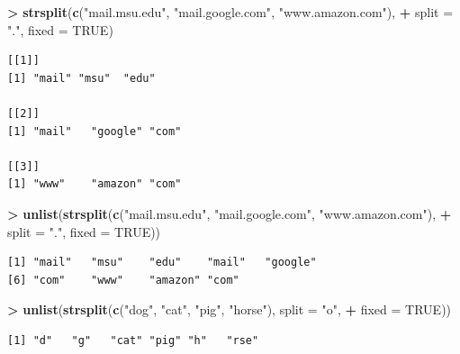 \documentclass[]{krantz}
\makeatletter
\newenvironment{Shaded}{\begin{snugshade}}{\end{snugshade}}
\newcommand{\DataTypeTok}[1]{\textcolor[rgb]{0.27,0.27,0.27}{#1}}
\newcommand{\KeywordTok}[1]{\textcolor[rgb]{0.27,0.27,0.27}{\textbf{#1}}}
\newcommand{\NormalTok}[1]{#1}
\newcommand{\OperatorTok}[1]{\textcolor[rgb]{0.43,0.43,0.43}{\textbf{#1}}}
\newcommand{\OtherTok}[1]{\textcolor[rgb]{0.37,0.37,0.37}{#1}}
\newcommand{\StringTok}[1]{\textcolor[rgb]{0.5,0.5,0.5}{#1}}
\newenvironment{kframe}{%
\medskip{}
\setlength{\fboxsep}{.8em}
 \def\at@end@of@kframe{}%
 \ifinner\ifhmode%
  \def\at@end@of@kframe{\end{minipage}}%
  \begin{minipage}{\columnwidth}%
 \fi\fi%
 \def\FrameCommand##1{\hskip\@totalleftmargin \hskip-\fboxsep
 \colorbox{shadecolor}{##1}\hskip-\fboxsep
     \hskip-\linewidth \hskip-\@totalleftmargin \hskip\columnwidth}%
 \MakeFramed {\advance\hsize-\width
   \@totalleftmargin\z@ \linewidth\hsize
   \@setminipage}}%
 {\par\unskip\endMakeFramed%
 \at@end@of@kframe}
\renewenvironment{Shaded}{\begin{kframe}}{\end{kframe}}
\makeatother
\begin{document}
\begin{Shaded}
\begin{Highlighting}[]
\OperatorTok{>}\StringTok{ }\KeywordTok{strsplit}\NormalTok{(}\KeywordTok{c}\NormalTok{(}\StringTok{"mail.msu.edu"}\NormalTok{, }\StringTok{"mail.google.com"}\NormalTok{, }\StringTok{"www.amazon.com"}\NormalTok{), }
\OperatorTok{+}\StringTok{   }\DataTypeTok{split =} \StringTok{"."}\NormalTok{, }\DataTypeTok{fixed =} \OtherTok{TRUE}\NormalTok{)}
\end{Highlighting}
\end{Shaded}

\begin{verbatim}
[[1]]
[1] "mail" "msu"  "edu" 

[[2]]
[1] "mail"   "google" "com"   

[[3]]
[1] "www"    "amazon" "com"   
\end{verbatim}

\begin{Shaded}
\begin{Highlighting}[]
\OperatorTok{>}\StringTok{ }\KeywordTok{unlist}\NormalTok{(}\KeywordTok{strsplit}\NormalTok{(}\KeywordTok{c}\NormalTok{(}\StringTok{"mail.msu.edu"}\NormalTok{, }\StringTok{"mail.google.com"}\NormalTok{, }\StringTok{"www.amazon.com"}\NormalTok{), }
\OperatorTok{+}\StringTok{   }\DataTypeTok{split =} \StringTok{"."}\NormalTok{, }\DataTypeTok{fixed =} \OtherTok{TRUE}\NormalTok{))}
\end{Highlighting}
\end{Shaded}

\begin{verbatim}
[1] "mail"   "msu"    "edu"    "mail"   "google"
[6] "com"    "www"    "amazon" "com"   
\end{verbatim}

\begin{Shaded}
\begin{Highlighting}[]
\OperatorTok{>}\StringTok{ }\KeywordTok{unlist}\NormalTok{(}\KeywordTok{strsplit}\NormalTok{(}\KeywordTok{c}\NormalTok{(}\StringTok{"dog"}\NormalTok{, }\StringTok{"cat"}\NormalTok{, }\StringTok{"pig"}\NormalTok{, }\StringTok{"horse"}\NormalTok{), }\DataTypeTok{split =} \StringTok{"o"}\NormalTok{, }
\OperatorTok{+}\StringTok{   }\DataTypeTok{fixed =} \OtherTok{TRUE}\NormalTok{))}
\end{Highlighting}
\end{Shaded}

\begin{verbatim}
[1] "d"   "g"   "cat" "pig" "h"   "rse"
\end{verbatim}
\end{document}
